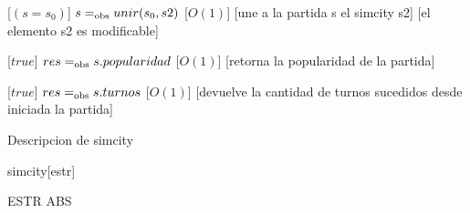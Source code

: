 \begin{Interfaz}
[$(s=s_0)$]
  {$s =_{\mathrm{obs}} unir(s_0, s2)$}%
    [$O(1)$]
  [une a la partida s el simcity s2]
  [el elemento s2 es modificable]
  
[$true$]
  {$res =_{\mathrm{obs}} s.popularidad$}%
    [$O(1)$]
  [retorna la popularidad de la partida]
  
[$true$]
  {$res =_{\mathrm{obs}} s.turnos$}%
    [$O(1)$]
  [devuelve la cantidad de turnos sucedidos desde iniciada la partida]

\end{Interfaz}

\begin{Representacion} %
  

    Descripcion de simcity

  \begin{Estructura}{simcity}[estr]
    \begin{Tupla}[estr]
    \end{Tupla}
  \end{Estructura}
    
    ESTR
    ABS
    

    
    
    
    
    
    

\end{Representacion}
